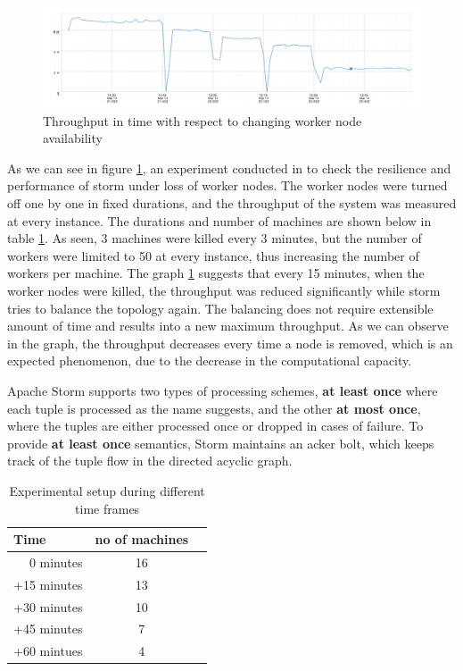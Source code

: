 \documentclass[runningheads,a4paper]{llncs}[2015/06/24]
\begin{document}
\begin{figure}
  \begin{center}
    \includegraphics[width=\textwidth, height=0.25\textheight]{throughput.png}
    \caption{Throughput in time with respect to changing worker node availability \cite{stormtwitter}}
    \label{fig:throughput}
   \end{center}
\end{figure}

As we can see in figure \ref{fig:throughput}, an experiment conducted in \cite{stormtwitter} to check the resilience and performance of storm under loss of worker nodes. The worker nodes were turned off one by one in fixed durations, and the throughput of the system was measured at every instance. The durations and number of machines are shown below in table \ref{tab:experiment}. As seen, 3 machines were killed every 3 minutes, but the number of workers were limited to 50 at every instance, thus increasing the number of workers per machine. The graph \ref{fig:throughput} suggests that every 15 minutes, when the worker nodes were killed, the throughput was reduced significantly while storm tries to balance the topology again. The balancing does not require extensible amount of time and results into a new maximum throughput. As we can observe in the graph, the throughput decreases every time a node is removed, which is an expected phenomenon, due to the decrease in the computational capacity.

Apache Storm supports two types of processing schemes, \textbf{at least once} where each tuple is processed as the name suggests, and the other \textbf{at most once}, where the tuples are either processed once or dropped in cases of failure. To provide \textbf{at least once} semantics, Storm maintains an acker bolt, which keeps track of the tuple flow in the directed acyclic graph.

\begin{table}
\caption{Experimental setup during different time frames}
\label{tab:experiment}
\begin{center}
\begin{tabular}{r@{\quad}cl}
\hline
\multicolumn{1}{l}{\rule{0pt}{12pt} 
	Time}&\multicolumn{1}{l}{no of machines}\\[2pt]
\hline\rule{0pt}{12pt}
0 minutes  & 16  \\
+15 minutes & 13 \\
+30 minutes & 10 \\
+45 minutes & 7 \\
+60 mintues & 4 \\[2pt]
\hline
\end{tabular}
\end{center}
\end{table}
\end{document}
